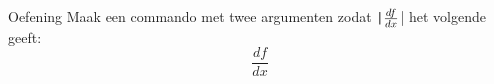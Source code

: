 \begin{frame}[fragile]{Oefening}
Maak een commando \texttt{\der} met twee argumenten zodat 
\texttt|$\der{f}{x}$| het volgende geeft:
\[\frac{d f}{dx} \]

\pause 
\begin{tcolorbox}[colback=white, colframe=green!70!black,title={Antwoord}]
    \texttt{\newcommand{\der}[2]{\frac{d #1}{d #2}}}
\end{tcolorbox}
\end{frame}